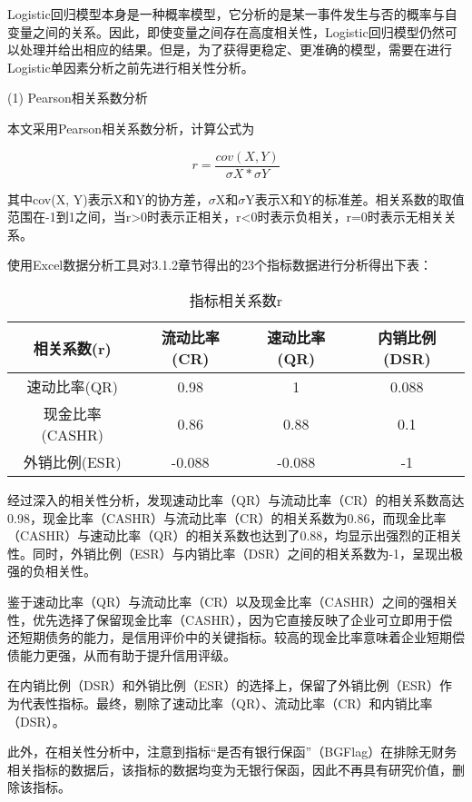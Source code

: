 Logistic回归模型本身是一种概率模型，它分析的是某一事件发生与否的概率与自变量之间的关系。因此，即使变量之间存在高度相关性，Logistic回归模型仍然可以处理并给出相应的结果。但是，为了获得更稳定、更准确的模型，需要在进行Logistic单因素分析之前先进行相关性分析。

(1) Pearson相关系数分析

本文采用Pearson相关系数分析，计算公式为

\begin{equation}
	r = \frac{cov(X, Y)}{\sigma X * \sigma Y} 
\end{equation}

其中cov(X, Y)表示X和Y的协方差，$\sigma$X和$\sigma$Y表示X和Y的标准差。相关系数的取值范围在-1到1之间，当r>0时表示正相关，r<0时表示负相关，r=0时表示无相关关系。

使用Excel数据分析工具对3.1.2章节得出的23个指标数据进行分析得出下表：

\begin{table}[h]
	\caption{指标相关系数r}
	\label{tab:papercomponents}
	\centering
	\begin{tabular}{cccc}
		\toprule
		相关系数(r) & 流动比率(CR) & 速动比率(QR) &  内销比例(DSR) \\
		\midrule
		速动比率(QR) &  0.98  &  1 &  0.088 \\
		现金比率(CASHR) &  0.86  &  0.88 &  0.1 \\	
		外销比例(ESR)&  -0.088  &  -0.088 &  -1 \\	
		\bottomrule
	\end{tabular}
\end{table}

	经过深入的相关性分析，发现速动比率（QR）与流动比率（CR）的相关系数高达0.98，现金比率（CASHR）与流动比率（CR）的相关系数为0.86，而现金比率（CASHR）与速动比率（QR）的相关系数也达到了0.88，均显示出强烈的正相关性。同时，外销比例（ESR）与内销比率（DSR）之间的相关系数为-1，呈现出极强的负相关性。
	
	鉴于速动比率（QR）与流动比率（CR）以及现金比率（CASHR）之间的强相关性，优先选择了保留现金比率（CASHR），因为它直接反映了企业可立即用于偿还短期债务的能力，是信用评价中的关键指标。较高的现金比率意味着企业短期偿债能力更强，从而有助于提升信用评级。
	
	在内销比例（DSR）和外销比例（ESR）的选择上，保留了外销比例（ESR）作为代表性指标。最终，剔除了速动比率（QR）、流动比率（CR）和内销比率（DSR）。
	
	此外，在相关性分析中，注意到指标“是否有银行保函”（BGFlag）在排除无财务相关指标的数据后，该指标的数据均变为无银行保函，因此不再具有研究价值，删除该指标。
	
